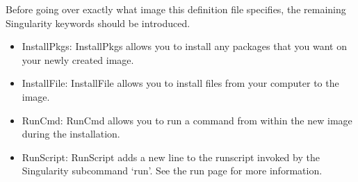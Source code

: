 \documentclass[letterpaper,10pt,english]{sphinxmanual}
\begin{document}
%
\begin{sphinxVerbatim}[commandchars=\\\{\}]
 

 

 





 

 

  

  

    

    


\end{sphinxVerbatim}

Before going over exactly what image this definition file specifies, the remaining Singularity keywords should be introduced.
\begin{itemize}
\item {} 
InstallPkgs: InstallPkgs allows you to install any packages that you want on your newly created image.

\item {} 
InstallFile: InstallFile allows you to install files from your computer to the image.

\item {} 
RunCmd: RunCmd allows you to run a command from within the new image during the installation.

\item {} 
RunScript: RunScript adds a new line to the runscript invoked by the Singularity subcommand ‘run’. See the run page for more information.

\end{itemize}
\end{document}
